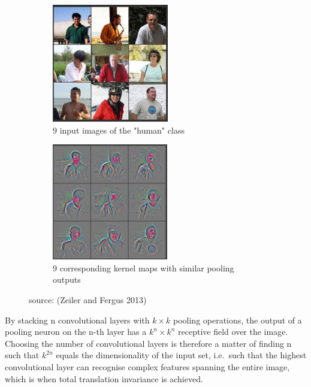 \documentclass[a4paper,11pt]{article}
\begin{document}
\begin{figure}
    \centering
    \begin{minipage}[b]{\textwidth}
      \begin{subfigure}{.5\textwidth} 
        \centering
        \includegraphics[scale=0.7]{images/high_level_invariance_orig.png}
        \caption{9 input images of the "human" class}\label{fig:2b}
      \end{subfigure}%
      \begin{subfigure}{.5\textwidth} 
        \centering
        \includegraphics[scale=0.7]{images/high_level_invariance.png}
        \caption{9 corresponding kernel maps with similar pooling outputs}\label{fig:2a}
      \end{subfigure} \par \vspace*{20pt} %
    \caption{source: (Zeiler and Fergus 2013)}
    \end{minipage}%
    \label{f23}
\end{figure}

By stacking n convolutional layers with $k \times k$ pooling operations, the output of a pooling neuron on the n-th layer has a $k^n \times k^n$ receptive field over the image. Choosing the number of convolutional layers is therefore a matter of finding n such that $k^{2n}$ equals the dimensionality of the input set, i.e.\ such that the highest convolutional layer can recognise complex features spanning the entire image, which is when total translation invariance is achieved. \\
\end{document}
